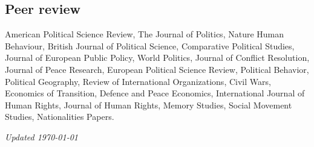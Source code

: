 \documentclass[a4paper, 12pt]{article}
\begin{document}
\subsection*{Peer review}

American Political Science Review, The Journal of Politics, Nature Human Behaviour, British Journal of Political Science, Comparative Political Studies, Journal of European Public Policy, World Politics, Journal of Conflict Resolution, Journal of Peace Research, European Political Science Review, Political Behavior, Political Geography, Review of International Organizations, Civil Wars, Economics of Transition, Defence and Peace Economics, International Journal of Human Rights, Journal of Human Rights, Memory Studies, Social Movement Studies, Nationalities Papers.


%

%
%
%

\vfill

\noindent
\flushright
{\small\it Updated \monthdate\today}
\end{document}
